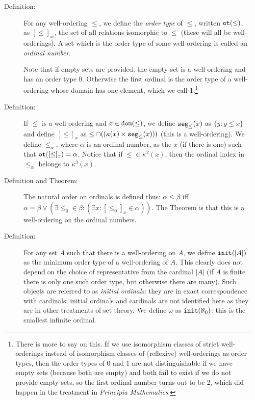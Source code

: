 \documentclass[12pt]{article}
\begin{document}
\begin{description}
\item[Definition:]  For any well-ordering $\leq$, we define the {\em order type\/} of $\leq$, written ${\tt ot}(\leq)$, as $[\leq]_\approx$, the set of all relations isomorphic to $\leq$ (these will all be well-orderings).  A set which is the order type of some well-ordering is called an {\em ordinal number\/}.

Note that if empty sets are provided, the empty set is a well-ordering and has an order type 0.  Otherwise the first ordinal is the order type of a well-ordering whose domain has one element, which we call 1.\footnote{There is more to say on this.  If we use isomorphism classes of strict well-orderings instead of isomorphism classes of (reflexive) well-orderings as order types, then the order types of 0 and 1 are not distinguishable if we have empty sets (because both are empty) and both fail to exist if we do not provide empty sets, so the first ordinal number turns out to be 2, which did happen in the treatment in {\em Principia Mathematics\/}.}

\item[Definition:]  If $\leq$ is a well-ordering and $x \in {\tt dom}(\leq)$, we define  ${\tt seg}_\leq(x)$ as $\{y:y \leq x\}$ and define $[\leq]_x$ as $\leq \cap ((\kappa(x) \times{\tt seg}_\leq(x)))$ (this is a well-ordering).  We define $\leq_\alpha$, where $\alpha$ is an ordinal number, as the $x$ (if there is one) such that ${\tt ot}([\leq]_x) = \alpha$.  Notice that if $\leq \in \kappa^2(x)$, then the ordinal index in $\leq_\alpha$ belongs to $\kappa^3(x)$.

\item[Definition and Theorem:]  The natural order on ordinals is defined thus:  $\alpha \leq \beta$ iff $\alpha = \beta \vee (\exists \leq_0 \in \beta:(\exists x:[\leq_0]_x \in \alpha))$.  The Theorem is that this is a well-ordering on the ordinal numbers.

\item[Definition:]  For any set $A$ such that there is a well-ordering on $A$, we define ${\tt init}(|A|)$ as the minimum order type of a well-ordering of $A$.  This clearly does not depend on the choice of representative from the cardinal $|A|$ (if $A$ is finite there is only one such order type,  but otherwise there are many).
Such objects are referred to as {\em initial ordinals\/}:  they are in exact correspondence with cardinals;  initial ordinals and cardinals are not identified here as they are in other treatments of set theory.  We define $\omega$ as ${\tt init}(\aleph_0)$:  this is the smallest infinite ordinal.


\end{description}
\end{document}
